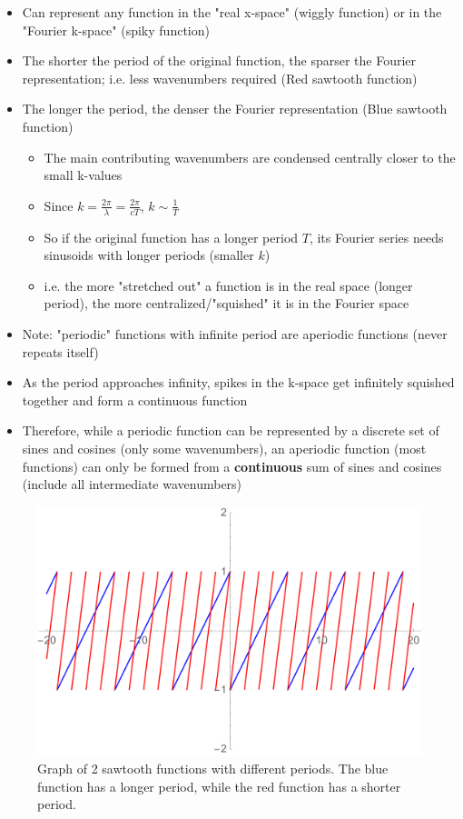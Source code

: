 \documentclass[a4paper,12pt]{article}
\begin{document}
\begin{itemize}
  \item Can represent any function in the "real x-space" (wiggly function) or in the "Fourier k-space" (spiky function)
  \item The shorter the period of the original function, the sparser the Fourier representation; i.e. less wavenumbers required (Red sawtooth function)
  \item The longer the period, the denser the Fourier representation (Blue sawtooth function)
  \begin{itemize}
    \item The main contributing wavenumbers are condensed centrally closer to the small k-values
    \item Since $k = \frac{2\pi}{\lambda} = \frac{2\pi}{c T}$, $k \sim \frac{1}{T}$
    \item So if the original function has a longer period $T$, its Fourier series needs sinusoids with longer periods (smaller $k$)
    \item i.e. the more "stretched out" a function is in the real space (longer period), the more centralized/"squished" it is in the Fourier space
  \end{itemize}
  \item Note: "periodic" functions with infinite period are aperiodic functions (never repeats itself)
  \item As the period approaches infinity, spikes in the k-space get infinitely squished together and form a continuous function
  \item Therefore, while a periodic function can be represented by a discrete set of sines and cosines (only some wavenumbers), an aperiodic function (most functions) can only be formed from a \textbf{continuous} sum of sines and cosines (include all intermediate wavenumbers)
\end{itemize}

\begin{figure}[H]
  \centering
  \includegraphics[width=140mm, scale=0.5]{images/sawtooth-comparison.pdf}
  \caption{Graph of 2 sawtooth functions with different periods. The blue function has a longer period, while the red function has a shorter period.}
  \label{Sawtooth-k-space}
\end{figure}
\end{document}

